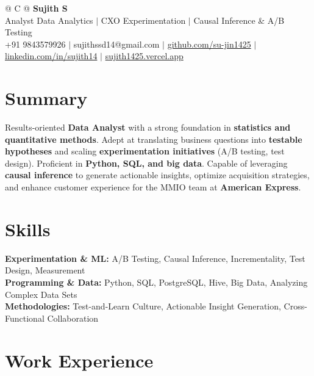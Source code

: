 \documentclass[a4paper,10pt]{article}
\newcommand{\ulink}[2]{\href{#1}{#2}}
\begin{document}
\pagestyle{empty}

\begin{tabularx}{\linewidth}{@{} C @{}}
{\color[HTML]{000000}\fontsize{30}{35}\selectfont\bfseries Sujith S} \\[5pt]
{\fontsize{10.5}{12.5}\selectfont\color[HTML]{3A3A3A}
Analyst Data Analytics $|$ CXO Experimentation $|$ Causal Inference \& A/B Testing} \\[6pt]
{\fontsize{9.5}{11.5}\selectfont\textcolor[HTML]{3A3A3A}{+91 9843579926 $|$ sujithssd14@gmail.com $|$ \ulink{https://github.com/su-jin1425}{github.com/su-jin1425} $|$ \ulink{https://linkedin.com/in/sujith14}{linkedin.com/in/sujith14} $|$ \ulink{https://sujith1425.vercel.app}{sujith1425.vercel.app}}}
\end{tabularx}

\section{Summary}
\vspace{2pt}

{\color[HTML]{0A0A0A}\fontsize{11}{14}\selectfont
Results-oriented \textbf{Data Analyst} with a strong foundation in \textbf{statistics and quantitative methods}. Adept at translating business questions into \textbf{testable hypotheses} and scaling \textbf{experimentation initiatives} (A/B testing, test design). Proficient in \textbf{Python, SQL, and big data}. Capable of leveraging \textbf{causal inference} to generate actionable insights, optimize acquisition strategies, and enhance customer experience for the MMIO team at \textbf{American Express}.}

\section{Skills}
\vspace{2pt}

{\color[HTML]{0A0A0A}\fontsize{11}{14}\selectfont
\textbf{Experimentation \& ML:} A/B Testing, Causal Inference, Incrementality, Test Design, Measurement \\[2pt]
\textbf{Programming \& Data:} Python, SQL, PostgreSQL, Hive, Big Data, Analyzing Complex Data Sets \\[2pt]
\textbf{Methodologies:} Test-and-Learn Culture, Actionable Insight Generation, Cross-Functional Collaboration}

\section{Work Experience}
\vspace{2pt}
\end{document}
